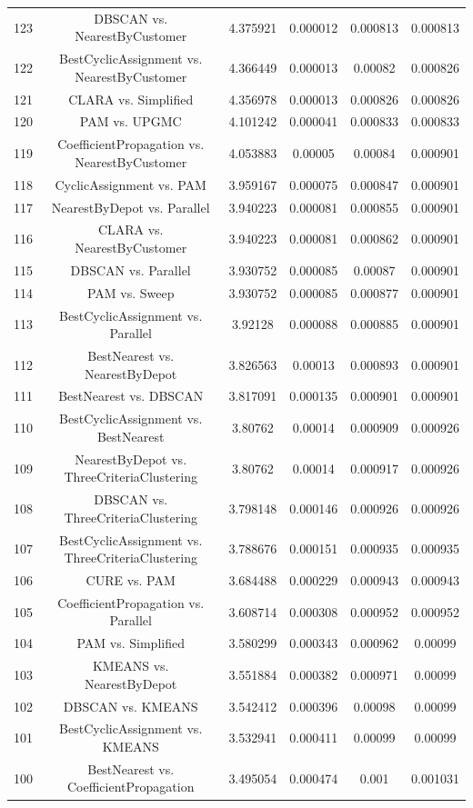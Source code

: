 \documentclass[a4paper,10pt]{article}
\begin{document}
\begin{landscape}
\begin{table}[!htp]
\begin{tabular}{cccccc}
123&DBSCAN vs. NearestByCustomer&4.375921&0.000012&0.000813&0.000813\\
122&BestCyclicAssignment vs. NearestByCustomer&4.366449&0.000013&0.00082&0.000826\\
121&CLARA vs. Simplified&4.356978&0.000013&0.000826&0.000826\\
120&PAM vs. UPGMC&4.101242&0.000041&0.000833&0.000833\\
119&CoefficientPropagation vs. NearestByCustomer&4.053883&0.00005&0.00084&0.000901\\
118&CyclicAssignment vs. PAM&3.959167&0.000075&0.000847&0.000901\\
117&NearestByDepot vs. Parallel&3.940223&0.000081&0.000855&0.000901\\
116&CLARA vs. NearestByCustomer&3.940223&0.000081&0.000862&0.000901\\
115&DBSCAN vs. Parallel&3.930752&0.000085&0.00087&0.000901\\
114&PAM vs. Sweep&3.930752&0.000085&0.000877&0.000901\\
113&BestCyclicAssignment vs. Parallel&3.92128&0.000088&0.000885&0.000901\\
112&BestNearest vs. NearestByDepot&3.826563&0.00013&0.000893&0.000901\\
111&BestNearest vs. DBSCAN&3.817091&0.000135&0.000901&0.000901\\
110&BestCyclicAssignment vs. BestNearest&3.80762&0.00014&0.000909&0.000926\\
109&NearestByDepot vs. ThreeCriteriaClustering&3.80762&0.00014&0.000917&0.000926\\
108&DBSCAN vs. ThreeCriteriaClustering&3.798148&0.000146&0.000926&0.000926\\
107&BestCyclicAssignment vs. ThreeCriteriaClustering&3.788676&0.000151&0.000935&0.000935\\
106&CURE vs. PAM&3.684488&0.000229&0.000943&0.000943\\
105&CoefficientPropagation vs. Parallel&3.608714&0.000308&0.000952&0.000952\\
104&PAM vs. Simplified&3.580299&0.000343&0.000962&0.00099\\
103&KMEANS vs. NearestByDepot&3.551884&0.000382&0.000971&0.00099\\
102&DBSCAN vs. KMEANS&3.542412&0.000396&0.00098&0.00099\\
101&BestCyclicAssignment vs. KMEANS&3.532941&0.000411&0.00099&0.00099\\
100&BestNearest vs. CoefficientPropagation&3.495054&0.000474&0.001&0.001031\\

\end{tabular}
\end{table}
\end{landscape}
\end{document}
